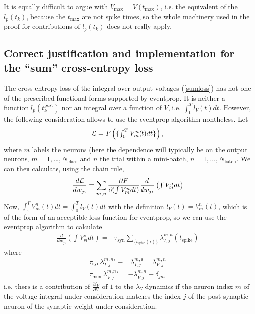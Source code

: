 \documentclass[a4paper]{article}
\begin{document}
 It is equally difficult to argue with
  $V_{\text{max}} = V(t_{\text{max}})$, i.e. the equivalent of the $l_p(t_k)$, because the $t_{\text{max}}$ are not
  spike times, so the whole machinery used in the proof for
  contributions of $l_p(t_k)$ does not really apply.

  \subsection{Correct justification and implementation for the ``sum'' cross-entropy loss}
  The cross-entropy loss of the integral over output voltages (\ref{sumloss}) has not one of the prescribed functional forms supported by eventprop. It is neither a function $l_p(t_k^{\text{post}})$ nor an integral over a function of $V$, i.e. $\int_0^T l_V(t) dt$. However, the following consideration allows to use the eventprop algorithm nontheless.
  Let
  \begin{align}
    {\cal L} = F\left(\{\textstyle \int_0^T V_m^n(t) dt\}\right), \label{eqn:loss_gen}
  \end{align}
  where $m$ labels the neurons (here the dependence will typically be on the output neurons, $m= 1, \ldots, N_{\text{class}}$ and $n$ the trial within a mini-batch, $n= 1, \ldots, N_{\text{batch}}$. We can then calculate, using the chain rule,
  \begin{align}
    \frac{d{\cal L}}{d w_{ji}} = \sum_{m,n} \frac{\partial F}{\partial (\int V_m^n dt)} \frac{d}{d w_{ji}} \left(\textstyle\int V_m^n dt\right)
  \end{align}
  Now, $\int_0^T V_m^n(t) dt = \int_0^T l_V(t) dt$ with the definition $l_V(t)= V_m^n(t)$, which is of the form of an acceptible loss function for eventprop, so we can use the eventprop algorithm to calculate
  \begin{align}
    \frac{d}{d w_{ji}} (\int V_m^n dt) = -\tau_{\text{syn}} \sum_{\{t_{\text{spike}}(i)\}} \lambda_{I,j}^{m,n}(t_{\text{spike}})
  \end{align}
  where
  \begin{align}
    \tau_{\text{syn}} {\lambda_{I,j}^{m,n}}' = -\lambda_{I,j}^{m,n} + \lambda_{V,j}^{m,n} \\
    \tau_{\text{mem}} {\lambda_{V,j}^{m,n}}' = -\lambda_{V,j}^{m,n} - \delta_{jm}
  \end{align}
  i.e. there is a contribution of $\frac{\partial l_V}{\partial V}$ of $1$ to the $\lambda_V$ dynamics if the neuron index $m$ of the voltage integral under consideration matches the index $j$ of the post-synaptic neuron of the synaptic weight under consideration.
\end{document}
